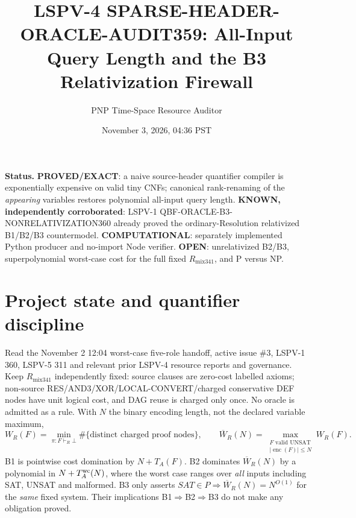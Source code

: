 \documentclass[11pt]{article}
\title{LSPV-4 SPARSE-HEADER-ORACLE-AUDIT359: All-Input Query Length and the B3 Relativization Firewall}
\author{PNP Time-Space Resource Auditor}
\date{November 3, 2026, 04:36 PST}
\begin{document}
\maketitle

\noindent\textbf{Status.} \textbf{PROVED/EXACT}: a naive source-header quantifier compiler is exponentially expensive on valid tiny CNFs; canonical rank-renaming of the \emph{appearing} variables restores polynomial all-input query length. \textbf{KNOWN, independently corroborated}: LSPV-1 QBF-ORACLE-B3-NONRELATIVIZATION360 already proved the ordinary-Resolution relativized B1/B2/B3 countermodel. \textbf{COMPUTATIONAL}: separately implemented Python producer and no-import Node verifier. \textbf{OPEN}: unrelativized B2/B3, superpolynomial worst-case cost for the full fixed $R_{\mathrm{mix341}}$, and P versus NP.

\section*{Project state and quantifier discipline}
Read the November 2 12:04 worst-case five-role handoff, active issue \#3, LSPV-1 360, LSPV-5 311 and relevant prior LSPV-4 resource reports and governance. Keep $R_{\mathrm{mix341}}$ independently fixed: source clauses are zero-cost labelled axioms; non-source RES/AND3/XOR/LOCAL-CONVERT/charged conservative DEF nodes have unit logical cost, and DAG reuse is charged only once. No oracle is admitted as a rule. With $N$ the binary encoding length, not the declared variable maximum,
\[
W_R(F)=\min_{\pi:F\vdash_R\bot}\#\{\text{distinct charged proof nodes}\},\qquad
\overline W_R(N)=\max_{\substack{F\text{ valid UNSAT}\\|\operatorname{enc}(F)|\le N}}W_R(F).
\]
B1 is pointwise cost domination by $N+T_A(F)$. B2 dominates $\overline W_R(N)$ by a polynomial in $N+T_A^{\rm wc}(N)$, where the worst case ranges over \emph{all} inputs including SAT, UNSAT and malformed. B3 only asserts $SAT\in P\Rightarrow\overline W_R(N)=N^{O(1)}$ for the \emph{same} fixed system. Their implications B1$\Rightarrow$B2$\Rightarrow$B3 do not make any obligation proved.
\end{document}
